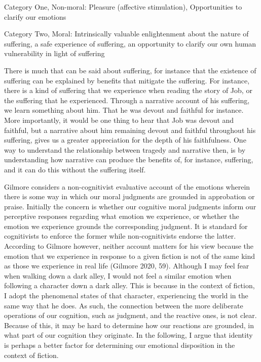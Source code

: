 \documentclass[
  letterpaper,
  DIV=11,
  numbers=noendperiod]{scrartcl}
\theoremstyle{remark}
\begin{document}
Category One, Non-moral: Pleasure (affective stimulation), Opportunities
to clarify our emotions

Category Two, Moral: Intrinsically valuable enlightenment about the
nature of suffering, a safe experience of suffering, an opportunity to
clarify our own human vulnerability in light of suffering

There is much that can be said about suffering, for instance that the
existence of suffering can be explained by benefits that mitigate the
suffering. For instance, there is a kind of suffering that we experience
when reading the story of Job, or the suffering that he experienced.
Through a narrative account of his suffering, we learn something about
him. That he was devout and faithful for instance. More importantly, it
would be one thing to hear that Job was devout and faithful, but a
narrative about him remaining devout and faithful throughout his
suffering, gives us a greater appreciation for the depth of his
faithfulness. One way to understand the relationship between tragedy and
narrative then, is by understanding how narrative can produce the
benefits of, for instance, suffering, and it can do this without the
suffering itself.

Gilmore considers a non-cognitivist evaluative account of the emotions
wherein there is some way in which our moral judgments are grounded in
approbation or praise. Initially the concern is whether our cognitive
moral judgments inform our perceptive responses regarding what emotion
we experience, or whether the emotion we experience grounds the
corresponding judgment. It is standard for cognitivists to enforce the
former while non-cognitivists endorse the latter. According to Gilmore
however, neither account matters for his view because the emotion that
we experience in response to a given fiction is not of the same kind as
those we experience in real life (Gilmore 2020, 59). Although I may feel
fear when walking down a dark alley, I would not feel a similar emotion
when following a character down a dark alley. This is because in the
context of fiction, I adopt the phenomenal states of that character,
experiencing the world in the same way that he does. As such, the
connection between the more deliberate operations of our cognition, such
as judgment, and the reactive ones, is not clear. Because of this, it
may be hard to determine how our reactions are grounded, in what part of
our cognition they originate. In the following, I argue that identity is
perhaps a better factor for determining our emotional disposition in the
context of fiction.
\end{document}
